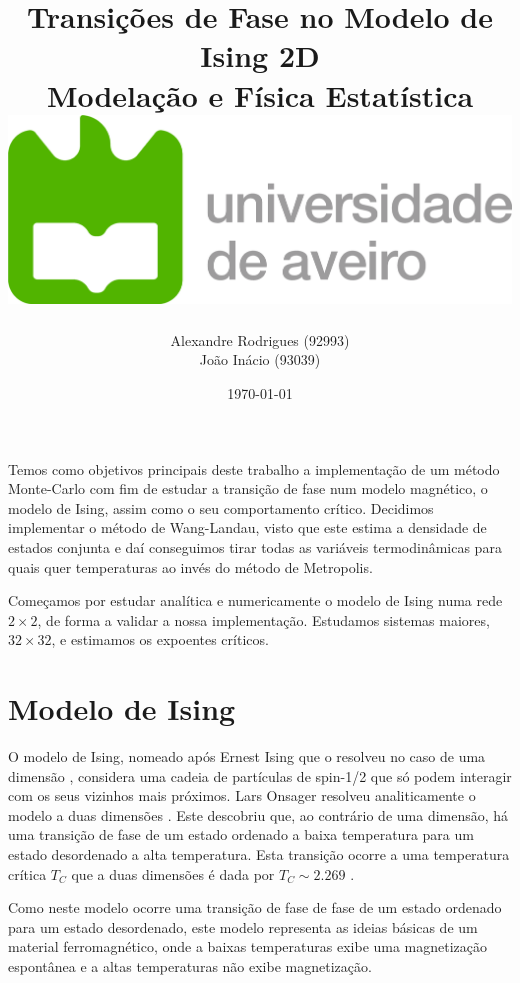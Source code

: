 \documentclass[12pt, a4paper]{article}
\title{
{Transições de Fase no Modelo de Ising 2D}\\
{\large Modelação e Física Estatística}
\\ \vspace{3cm}
{\includegraphics[scale=0.5]{Logo_UA.png}}
\vspace{6cm}
}
\author{Alexandre Rodrigues (92993) \\
	João Inácio	(93039)}
\date{\today}
\begin{document}
	\maketitle
	\newpage
	
	{\small Temos como objetivos principais deste trabalho a implementação de um método Monte-Carlo com fim de estudar a transição de fase num modelo magnético, o modelo de Ising, assim como o seu comportamento crítico. Decidimos implementar o método de Wang-Landau, visto que este estima a densidade de estados conjunta e daí conseguimos tirar todas as variáveis termodinâmicas para quais quer temperaturas ao invés do método de Metropolis. }
	
	{\small Começamos por estudar analítica e numericamente o modelo de Ising numa rede $2 \times 2$, de forma a validar a nossa implementação. Estudamos sistemas maiores, $32 \times 32$, e estimamos os expoentes críticos.}
	
	\section{Modelo de Ising}
	
	O modelo de Ising, nomeado após Ernest Ising que o resolveu no caso de uma dimensão \cite{ising}, considera uma cadeia de partículas de spin-1/2 que só podem interagir com os seus vizinhos mais próximos. Lars Onsager resolveu analiticamente o modelo a duas dimensões \cite{onsager}. Este descobriu que, ao contrário de uma dimensão, há uma transição de fase de um estado ordenado a baixa temperatura para um estado desordenado a alta temperatura. Esta transição ocorre a uma temperatura crítica $T_C$ que a duas dimensões é dada por $T_C \sim 2.269$  \cite{onsager}.
	
	Como neste modelo ocorre uma transição de fase de fase de um estado ordenado para um estado desordenado, este modelo representa as ideias básicas de um material ferromagnético, onde a baixas temperaturas exibe uma magnetização espontânea e a altas temperaturas não exibe magnetização.
	
	
\end{document}
